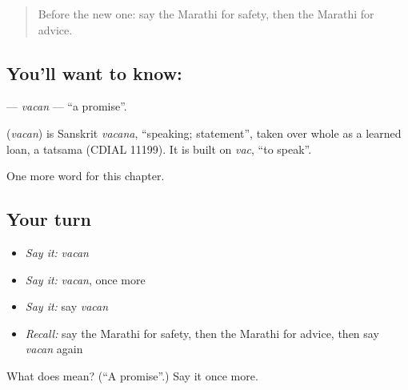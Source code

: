 \label{lesson:MR-C265-vacan}



\begin{quote}
Before the new one: say the Marathi for safety, then the Marathi for advice.
\end{quote}

\subsection*{You'll want to know: }
\textbf{} — \emph{vacan} — \textquotedblleft{}a promise\textquotedblright{}.

\begin{cousinweb}
\textbf{} (\emph{vacan}) is Sanskrit \emph{vacana}, \textquotedblleft{}speaking; statement\textquotedblright{}, taken over whole as a learned loan, a tatsama (CDIAL 11199). It is built on \emph{vac}, \textquotedblleft{}to speak\textquotedblright{}.
\end{cousinweb}

\begin{grammarlens}[title={What you've built}]
One more word for this chapter.
\end{grammarlens}

\subsection*{Your turn}
\begin{itemize}
\raggedright
  \item \emph{Say it:} \emph{vacan}
  \item \emph{Say it:} \emph{vacan}, once more
  \item \emph{Say it:} say \emph{vacan}
  \item \emph{Recall:} say the Marathi for safety, then the Marathi for advice, then say \emph{vacan} again
\end{itemize}

\begin{tcolorbox}[breakable,colback=teal!4,colframe=teal!35!black,title={Before you move on}]
What does  mean? (\textquotedblleft{}A promise\textquotedblright{}.) Say it once more.
\end{tcolorbox}
